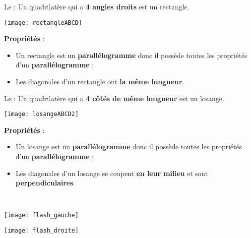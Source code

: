 \begin{minipage}[t]{0.49\linewidth}
  \begin{definition}
   Le  :
   Un quadrilatère qui a \textcolor{C2}{\textbf{4 angles droits}} est un rectangle.
   
    \begin{center}\texttt{[image: rectangleABCD]}\end{center}
    
   \textcolor{H1}{\textbf{Propriétés}} :
    \begin{itemize}
     \item Un rectangle est un \textcolor{H1}{\textbf{parallélogramme}} donc il possède toutes les propriétés d'un \textcolor{H1}{\textbf{parallélogramme}} ;
     \item Les diagonales d'un rectangle ont \textcolor{H1}{\textbf{la même longueur}}.
     \end{itemize}
   \end{definition}
 \end{minipage}
 \begin{minipage}[t]{0.49\linewidth}
   \begin{definition}
   Le  :
   Un quadrilatère qui a \textcolor{C2}{\textbf{4 côtés de même longueur}} est un losange.
   
     \begin{center}\texttt{[image: losangeABCD2]}\end{center}
    
   \textcolor{H1}{\textbf{Propriétés}} :
    \begin{itemize}
     \item Un losange est un \textcolor{H1}{\textbf{parallélogramme}} donc il possède toutes les propriétés d'un \textcolor{H1}{\textbf{parallélogramme}} ;
     \item Les diagonales d'un losange se coupent \textcolor{H1}{\textbf{en leur milieu}} et sont \textcolor{H1}{\textbf{perpendiculaires}}.
     \end{itemize}
   \end{definition}
  \end{minipage} \\
  
\begin{minipage}[t]{0.49\linewidth}
\begin{center} \texttt{[image: flash\_gauche]} \end{center}
 \end{minipage}
 \begin{minipage}[t]{0.49\linewidth}
\begin{center} \texttt{[image: flash\_droite]} \end{center}
 \end{minipage} \\ 
  
